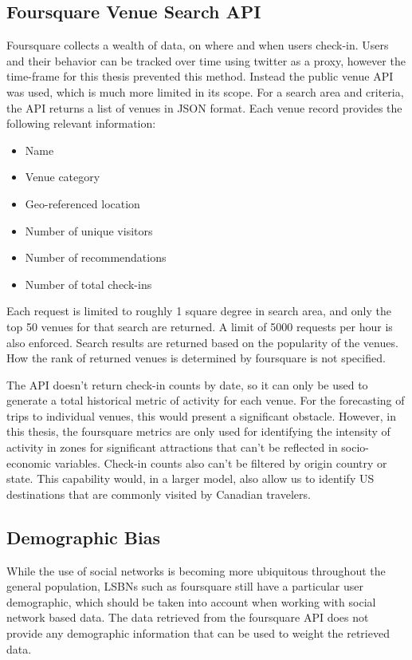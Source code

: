 \subsection{Foursquare Venue Search API}
Foursquare collects a wealth of data, on where and when users check-in. Users and their behavior can be tracked over time using twitter as a proxy, however the time-frame for this thesis prevented this method. Instead the public venue API was used, which is much more limited in its scope. For a search area and criteria, the API returns a list of venues in JSON format. Each venue record provides the following relevant information:
\begin{itemize}
\item Name
\item Venue category
\item Geo-referenced location
\item Number of unique visitors
\item Number of recommendations
\item Number of total check-ins
\end{itemize}

Each request is limited to roughly 1 square degree in search area, and only the top 50 venues for that search are returned. A limit of 5000 requests per hour is also enforced. Search results are returned based on the popularity of the venues. How the rank of returned venues is determined by foursquare is not specified. 

The API doesn't return check-in counts by date, so it can only be used to generate a total historical metric of activity for each venue. For the forecasting of trips to individual venues, this would present a significant obstacle. However, in this thesis, the foursquare metrics are only used for identifying the intensity of activity in zones for significant attractions that can't be reflected in socio-economic variables. Check-in counts also can't be filtered by origin country or state. This capability would, in a larger model, also allow us to identify US destinations that are commonly visited by Canadian travelers.

\subsection{Demographic Bias}
While the use of social networks is becoming more ubiquitous throughout the general population, LSBNs such as foursquare still have a particular user demographic, which should be taken into account when working with social network based data. The data retrieved from the foursquare API does not provide any demographic information that can be used to weight the retrieved data.

